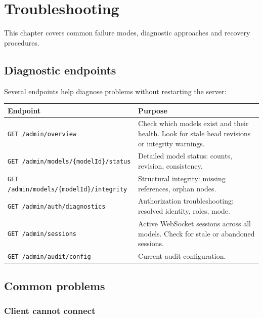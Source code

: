 \section{Troubleshooting}
\label{sec:Troubleshooting}

This chapter covers common failure modes, diagnostic approaches and recovery
procedures.

\subsection{Diagnostic endpoints}

Several endpoints help diagnose problems without restarting the server:

\begin{longtable}{p{54mm}p{100mm}}
\toprule
Endpoint & Purpose \\
\midrule
\texttt{GET /admin/overview} & Check which models exist and their health.
  Look for stale head revisions or integrity warnings. \\
\texttt{GET /admin/models/\{modelId\}/status} & Detailed model status:
  counts, revision, consistency. \\
\texttt{GET /admin/models/\{modelId\}/integrity} & Structural integrity:
  missing references, orphan nodes. \\
\texttt{GET /admin/auth/diagnostics} & Authorization troubleshooting:
  resolved identity, roles, mode. \\
\texttt{GET /admin/sessions} & Active WebSocket sessions across all
  models. Check for stale or abandoned sessions. \\
\texttt{GET /admin/audit/config} & Current audit configuration. \\
\bottomrule
\end{longtable}

\subsection{Common problems}

\subsubsection{Client cannot connect}

